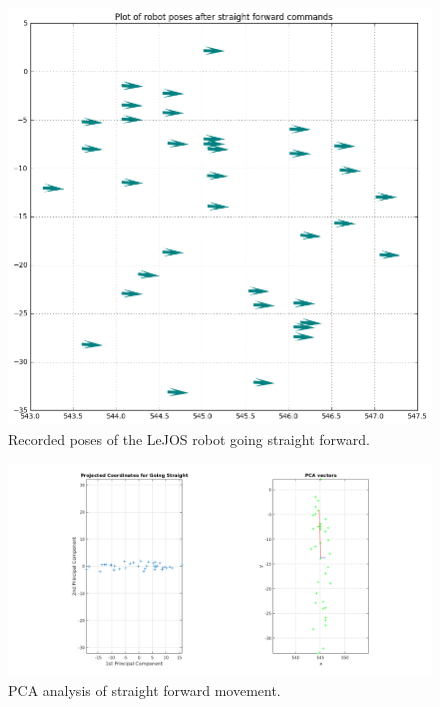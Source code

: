 \documentclass[paper=a4, fontsize=11pt]{scrartcl} %
\begin{document}
    \begin{figure}[H]
        \begin{center}
            \setlength{\fboxsep}{0.5pt} %
            \setlength{\fboxrule}{0.5pt}
            \includegraphics[width=0.7\linewidth,fbox]{images/poses_plot_1_straight.png}
            \caption{Recorded poses of the LeJOS robot going straight forward.}
        \end{center}
    \end{figure}
    \begin{figure}[h!]
        \begin{center}
            \setlength{\fboxsep}{0.5pt} %
            \setlength{\fboxrule}{0.5pt}
            \includegraphics[width=\linewidth,fbox]{images/pca_straight.png}
            \caption{PCA analysis of straight forward movement.}
        \end{center}
    \end{figure}
\end{document}
